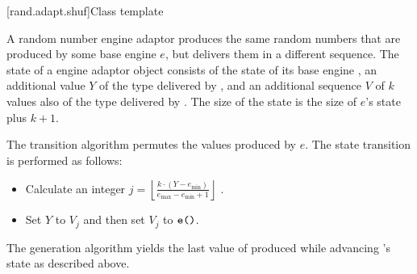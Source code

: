 [rand.adapt.shuf]{Class template }%
%

\pnum
A  random number engine adaptor
produces the same random numbers
that are produced by some base engine $e$,
but delivers them in a different sequence.
The state%
%
of a  engine adaptor object 
consists of
 the state  of its base engine ,
 an additional value $Y$ of the type delivered by ,
and
 an additional sequence $V$ of $k$ values
 also of the type delivered by .
The size of the state is
 the size of $e$'s state plus $k + 1$.

\pnum
The transition algorithm%
%
permutes the values produced by $e$.
The state transition is performed as follows:
\begin{itemize}
 \item
   Calculate an integer
   $j = \left\lfloor \frac{k \cdot (Y - e_{\min})}
                          {e_{\max} - e_{\min} +1}
        \right\rfloor
   $%
   .
 \item
   Set $Y$ to $V_j$ and then set $V_j$ to $\texttt{e()}$.
\end{itemize}

\pnum
The generation algorithm%
%
yields the last value of 
 produced while advancing 's state as described above.


